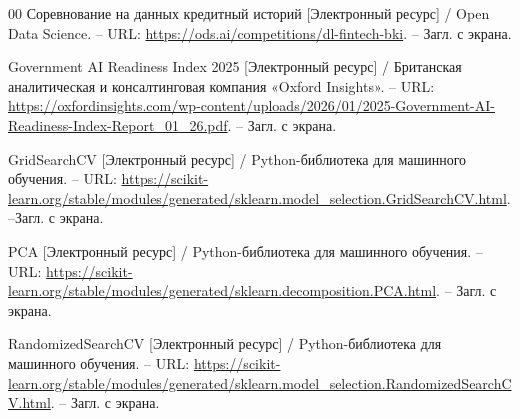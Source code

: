 \begin{thebibliography}{00}
	 Соревнование на данных кредитный историй [Электронный ресурс] / Open Data Science. -- URL: \url{https://ods.ai/competitions/dl-fintech-bki}. -- Загл. с экрана.
	
	 Government AI Readiness Index 2025 [Электронный ресурс] / Британская аналитическая и консалтинговая компания «Oxford Insights». -- URL: \url{https://oxfordinsights.com/wp-content/uploads/2026/01/2025-Government-AI-Readiness-Index-Report_01_26.pdf}. -- Загл. с экрана.
	
	 GridSearchCV [Электронный ресурс] / Python-библиотека для машинного обучения. -- URL: \url{https://scikit-learn.org/stable/modules/generated/sklearn.model_selection.GridSearchCV.html}. --Загл. с экрана.
	
	 PCA [Электронный ресурс] / Python-библиотека для машинного обучения. -- URL: \url{https://scikit-learn.org/stable/modules/generated/sklearn.decomposition.PCA.html}. -- Загл. с экрана.

	 RandomizedSearchCV [Электронный ресурс] / Python-библиотека для машинного обучения. -- URL: \url{https://scikit-learn.org/stable/modules/generated/sklearn.model_selection.RandomizedSearchCV.html}. -- Загл. с экрана.
	
\end{thebibliography}